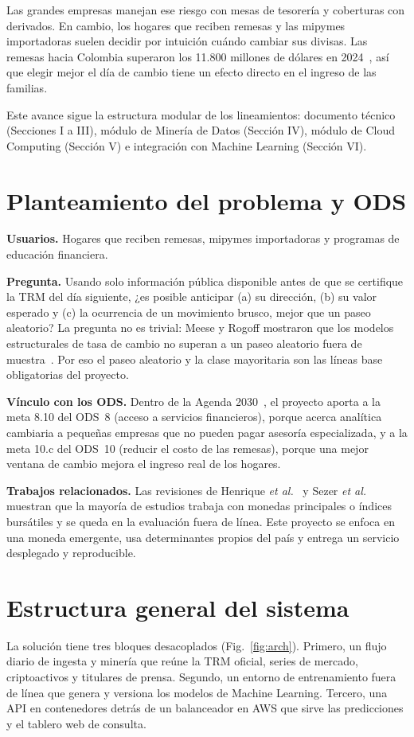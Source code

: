 \documentclass[conference]{IEEEtran}
\begin{document}
Las grandes empresas manejan ese riesgo con mesas de tesorería y coberturas con derivados. En cambio, los hogares que reciben remesas y las mipymes importadoras suelen decidir por intuición cuándo cambiar sus divisas. Las remesas hacia Colombia superaron los 11.800 millones de dólares en 2024~\cite{banrep_remesas}, así que elegir mejor el día de cambio tiene un efecto directo en el ingreso de las familias.

Este avance sigue la estructura modular de los lineamientos: documento técnico (Secciones I a III), módulo de Minería de Datos (Sección IV), módulo de Cloud Computing (Sección V) e integración con Machine Learning (Sección VI).

\section{Planteamiento del problema y ODS}
\textbf{Usuarios.} Hogares que reciben remesas, mipymes importadoras y programas de educación financiera.

\textbf{Pregunta.} Usando solo información pública disponible antes de que se certifique la TRM del día siguiente, ¿es posible anticipar (a) su dirección, (b) su valor esperado y (c) la ocurrencia de un movimiento brusco, mejor que un paseo aleatorio? La pregunta no es trivial: Meese y Rogoff mostraron que los modelos estructurales de tasa de cambio no superan a un paseo aleatorio fuera de muestra~\cite{meese1983}. Por eso el paseo aleatorio y la clase mayoritaria son las líneas base obligatorias del proyecto.

\textbf{Vínculo con los ODS.} Dentro de la Agenda 2030~\cite{un2015}, el proyecto aporta a la meta 8.10 del ODS~8 (acceso a servicios financieros), porque acerca analítica cambiaria a pequeñas empresas que no pueden pagar asesoría especializada, y a la meta 10.c del ODS~10 (reducir el costo de las remesas), porque una mejor ventana de cambio mejora el ingreso real de los hogares.

\textbf{Trabajos relacionados.} Las revisiones de Henrique \emph{et al.}~\cite{henrique2019} y Sezer \emph{et al.}~\cite{sezer2020} muestran que la mayoría de estudios trabaja con monedas principales o índices bursátiles y se queda en la evaluación fuera de línea. Este proyecto se enfoca en una moneda emergente, usa determinantes propios del país y entrega un servicio desplegado y reproducible.

\section{Estructura general del sistema}
La solución tiene tres bloques desacoplados (Fig.~\ref{fig:arch}). Primero, un flujo diario de ingesta y minería que reúne la TRM oficial, series de mercado, criptoactivos y titulares de prensa. Segundo, un entorno de entrenamiento fuera de línea que genera y versiona los modelos de Machine Learning. Tercero, una API en contenedores detrás de un balanceador en AWS que sirve las predicciones y el tablero web de consulta.
\end{document}
